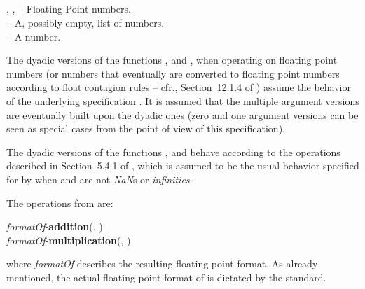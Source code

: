 \documentclass[../Arithmetic-Operations.tex]{subfiles}
\begin{document}
\index{*!\code{+}}
\index{*!\code{*}}

\DSyntax{}

\code{+}   \RArrow {}\\
\code{*}   \RArrow {}\\
\code{+}   \RArrow \varname {}\\
\code{*}   \RArrow \varname {}\\

\DArgsNValues{}

, ,  -- Floating Point numbers.\\
 -- A, possibly empty, list of numbers.\\
 -- A number.



\DDescription{}

The dyadic versions of the functions \code{+}, and \code{*}, when operating on
floating point numbers (or numbers that eventually are converted to
floating point numbers according to \CL{} float contagion rules -- cfr.,
Section~12.1.4 of \cite{1996:ANSIHyperSpec}) assume the behavior of the
underlying \IEEEFPStd{} specification \cite{2008:IEEE-754}.  It is assumed that
the multiple argument versions are eventually built upon the dyadic
ones (zero and one argument versions can be seen as special cases from
the point of view of this specification).

The dyadic versions of the functions \code{+}, and \code{*} behave
according to the \IEEEFPStd{} operations described in Section~5.4.1 of
\cite{2008:IEEE-754}, which is assumed to be the usual behavior specified
for \CL{} by \cite{1996:ANSIHyperSpec} when  and  are
not \emph{NaN}s or \emph{infinities}.

\noindent
The operations from \cite{2008:IEEE-754} are:

\vspace*{3mm}

\noindent
\textit{formatOf}-\textbf{addition}(, )\\
\textit{formatOf}-\textbf{multiplication}(, )

\vspace*{3mm}

\noindent
where \textit{formatOf} describes the resulting floating point
format.  As already mentioned, the actual floating point format of
 is dictated by the \CL{} standard.
\end{document}
